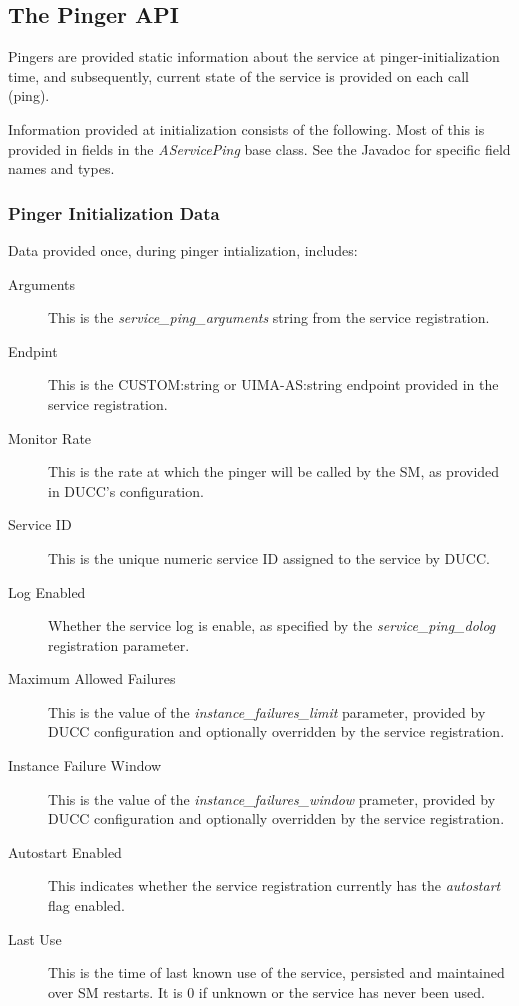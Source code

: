       \subsection{The Pinger API}

      Pingers are provided static  information about the service at pinger-initialization
      time, and subsequently, current state of the service is provided on each call (ping).

      Information provided at initialization consists of the following.  Most of this is
      provided in fields in the {\em AServicePing} base class.  See the Javadoc for 
      specific field names and types.

      \subsubsection{Pinger Initialization Data}
      Data provided once, during pinger intialization, includes:
      \begin{description}
        \item[Arguments] This is the {\em service\_ping\_arguments} string from the
          service registration.
        \item[Endpint] This is the CUSTOM:string or UIMA-AS:string endpoint provided
          in the service registration.
        \item[Monitor Rate] This is the rate at which the pinger will be called by
          the SM, as provided in DUCC's configuration.
        \item[Service ID] This is the unique numeric service ID assigned to the service
          by DUCC.
        \item[Log Enabled] Whether the service log is enable, as specified by the
          {\em service\_ping\_dolog} registration parameter.
        \item[Maximum Allowed Failures] This is the value of the {\em instance\_failures\_limit}
          parameter, provided by DUCC configuration and optionally overridden by the
          service registration.
        \item[Instance Failure Window] This is the value of the {\em instance\_failures\_window}
          prameter, provided by DUCC configuration and optionally overridden by the
          service registration.
        \item[Autostart Enabled] This indicates whether the service registration currently
          has the {\em autostart} flag enabled.
        \item[Last Use] This is the time of last known use of the service, persisted and
          maintained over SM restarts.  It is 0 if unknown or the service has never been
              used.
      \end{description}
        
